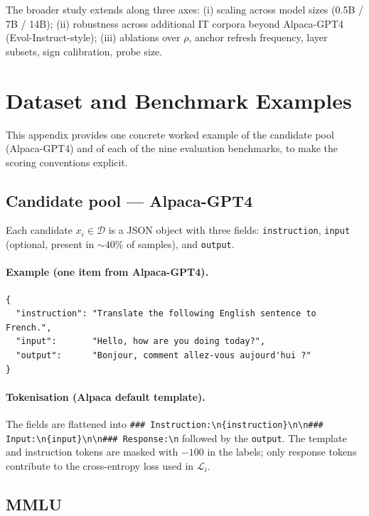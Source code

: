 The broader study extends along three axes: (i) scaling across
model sizes (0.5B / 7B / 14B); (ii) robustness across additional
IT corpora beyond Alpaca-GPT4 (Evol-Instruct-style); (iii)
ablations over $\rho$, anchor refresh frequency, layer subsets,
sign calibration, probe size.

\section{Dataset and Benchmark Examples}
\label{app:examples}

This appendix provides one concrete worked example of the candidate
pool (Alpaca-GPT4) and of each of the nine evaluation benchmarks,
to make the scoring conventions explicit.

\subsection{Candidate pool — Alpaca-GPT4}
\label{app:ex-alpaca}

Each candidate $x_i \in \mathcal{D}$ is a JSON object with three
fields: \texttt{instruction}, \texttt{input} (optional, present in
${\sim}40\%$ of samples), and \texttt{output}.

\paragraph{Example (one item from Alpaca-GPT4).}
\begin{verbatim}
{
  "instruction": "Translate the following English sentence to French.",
  "input":       "Hello, how are you doing today?",
  "output":      "Bonjour, comment allez-vous aujourd'hui ?"
}
\end{verbatim}

\paragraph{Tokenisation (Alpaca default template).}
The fields are flattened into
\verb|### Instruction:\n{instruction}\n\n### Input:\n{input}\n\n### Response:\n|
followed by the \texttt{output}. The template and instruction
tokens are masked with $-100$ in the labels; only response tokens
contribute to the cross-entropy loss used in $\mathcal{L}_i$.

\subsection{MMLU}
\label{app:ex-mmlu}

